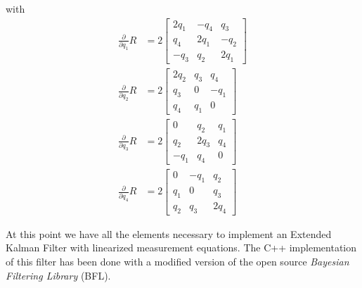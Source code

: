 \documentclass[a4paper,10pt]{article}
\begin{document}
  with
  \begin{align}
   \frac{\partial}{\partial q_1} R &= 2\left[ \begin{array}{ccc}
                                               2q_1 & -q_4 &  q_3 \\
                                               q_4  & 2q_1 & -q_2 \\
                                               -q_3 & q_2  & 2q_1
                                              \end{array}\right] \\
   \frac{\partial}{\partial q_2} R &= 2\left[ \begin{array}{ccc}
                                               2q_2 & q_3 & q_4 \\
                                               q_3  & 0   & -q_1 \\
                                               q_4  & q_1 & 0
                                              \end{array}\right] \\
   \frac{\partial}{\partial q_3} R &= 2\left[ \begin{array}{ccc}
                                               0    & q_2  & q_1 \\
                                               q_2  & 2q_3 & q_4 \\
                                              -q_1  & q_4  & 0
                                              \end{array}\right] \\
   \frac{\partial}{\partial q_4} R &= 2\left[ \begin{array}{ccc}
                                               0    & -q_1  & q_2 \\
                                               q_1  &  0    & q_3 \\
                                               q_2  & q_3   & 2q_4
                                              \end{array}\right]                                               
  \end{align}

  At this point we have all the elements necessary to implement an Extended Kalman Filter with linearized measurement equations. The C++ implementation of this filter has been done with a modified version of the open source \emph{Bayesian Filtering Library} (BFL).
  
\end{document}
